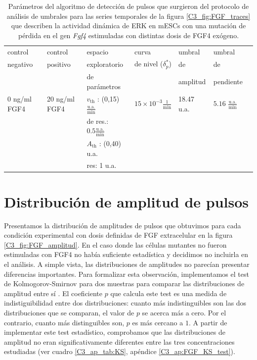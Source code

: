 \documentclass[./main.tex]{subfiles}
\begin{document}
\begin{subappendices}
\begin{table}[htbp]
\begin{adjustwidth}{-0.5in}{-0.5in}%
\centering
\begin{tabular}{|l|l|l|l|l|l|l|}
\hline
 control & control & espacio & curva & umbral & umbral \\
 negativo & positivo & exploratorio & de nivel ($\delta_p^*$) & de & de \\
 &  & de parámetros & & amplitud & pendiente \\
\hline \hline
0 ng/ml FGF4 & 20 ng/ml FGF4 & $v_{\text{th}}$ : (0,15) $\frac{\text{u.a.}}{\text{min}}$ & $15 \times 10^{-3} \frac{1}{\text{min}}$ & 18.47 u.a. & $5.16$ $\frac{\text{u.a.}}{\text{min}}$ \\
 & & de res.: $0.5 \frac{\text{u.a.}}{\text{min}}$ & & & \\
 & & $A_{\text{th}}$ : (0,40) u.a. & & & \\
 & & res: 1 u.a. & & & \\
\hline
\end{tabular}
\end{adjustwidth}
\caption{Parámetros del algoritmo de detección de pulsos que surgieron del protocolo de análisis de umbrales para las series temporales de la figura \ref{C3_fig:FGF_traces} que describen la actividad dinámica de ERK en mESCs con una mutación de pérdida en el gen \textit{Fgf4} estimuladas con distintas dosis de FGF4 exógeno.}
\label{C3_ap_tab:FGF_th}
\end{table}

\section{Distribución de amplitud de pulsos}
\label{ap_C3:amplitud}

Presentamos la distribución de amplitudes de pulsos que obtuvimos para cada condición experimental con dosis definidas de FGF extracelular en la figura \ref{C3_fig:FGF_amplitud}. En el caso donde las células mutantes no fueron estimuladas con FGF4 no había suficiente estadística y decidimos no incluirla en el análisis. A simple vista, las distribuciones de amplitudes no parecían presentar diferencias importantes. Para formalizar esta observación, implementamos el test de Kolmogorov-Smirnov para dos muestras para comparar las distribuciones de amplitud entre sí \cite{Frodesen1979}. El coeficiente $p$ que calcula este test es una medida de indistiguibilidad entre dos distribuciones: cuanto más indistinguibles son las dos distribuciones que se comparan, el valor de $p$ se acerca más a cero. Por el contrario, cuanto más distinguibles son, $p$  es más cercano a $1$. A partir de implementar este test estadístico, comprobamos que las distribuciones de amplitud no eran significativamente diferentes entre las tres concentraciones estudiadas (ver cuadro \ref{C3_ap_tab:KS}, apéndice \ref{C3_ap:FGF_KS_test}). 



\end{subappendices}
\end{document}
